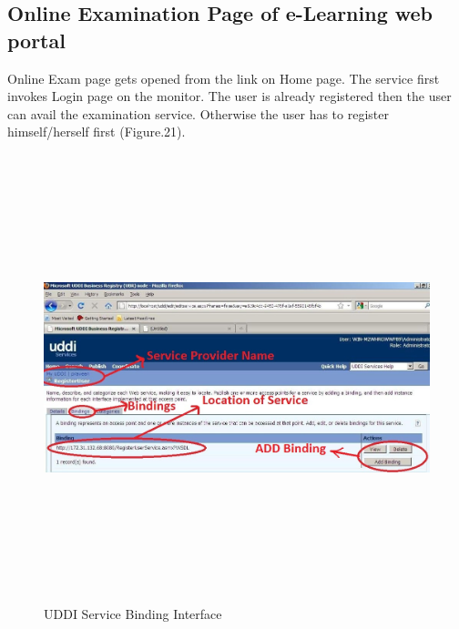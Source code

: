 \subsection{Online Examination Page of e-Learning web portal}
Online Exam page gets opened from the link on Home page. The service first invokes Login page on the monitor. The user is already
registered then the user can avail the examination service. Otherwise the user has to register himself/herself first (Figure.21).
\begin{figure}[h!]
 \centering
 \includegraphics[width=16cm,height=13cm]{uddi_service_binding_interface.jpg}
 \caption{UDDI Service Binding Interface}
\end{figure}